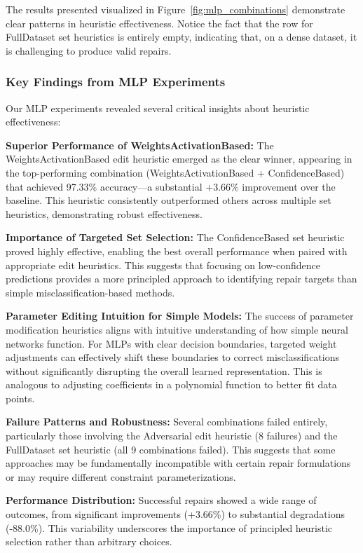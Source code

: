 \documentclass{article}
\begin{document}
The results presented visualized in Figure~\ref{fig:mlp_combinations} demonstrate clear patterns in heuristic effectiveness.
Notice the fact that the row for FullDataset set heuristics is entirely empty, indicating that, on a dense dataset, it is challenging to produce valid repairs.

\subsubsection{Key Findings from MLP Experiments}

Our MLP experiments revealed several critical insights about heuristic effectiveness:

\textbf{Superior Performance of WeightsActivationBased:} The WeightsActivationBased edit heuristic emerged as the clear winner, appearing in the top-performing combination (WeightsActivationBased + ConfidenceBased) that achieved 97.33\% accuracy—a substantial +3.66\% improvement over the baseline. This heuristic consistently outperformed others across multiple set heuristics, demonstrating robust effectiveness.

\textbf{Importance of Targeted Set Selection:} The ConfidenceBased set heuristic proved highly effective, enabling the best overall performance when paired with appropriate edit heuristics. This suggests that focusing on low-confidence predictions provides a more principled approach to identifying repair targets than simple misclassification-based methods.

\textbf{Parameter Editing Intuition for Simple Models:} The success of parameter modification heuristics aligns with intuitive understanding of how simple neural networks function. For MLPs with clear decision boundaries, targeted weight adjustments can effectively shift these boundaries to correct misclassifications without significantly disrupting the overall learned representation. This is analogous to adjusting coefficients in a polynomial function to better fit data points.

\textbf{Failure Patterns and Robustness:} Several combinations failed entirely, particularly those involving the Adversarial edit heuristic (8 failures) and the FullDataset set heuristic (all 9 combinations failed). This suggests that some approaches may be fundamentally incompatible with certain repair formulations or may require different constraint parameterizations.

\textbf{Performance Distribution:} Successful repairs showed a wide range of outcomes, from significant improvements (+3.66\%) to substantial degradations (-88.0\%). This variability underscores the importance of principled heuristic selection rather than arbitrary choices.
\end{document}

